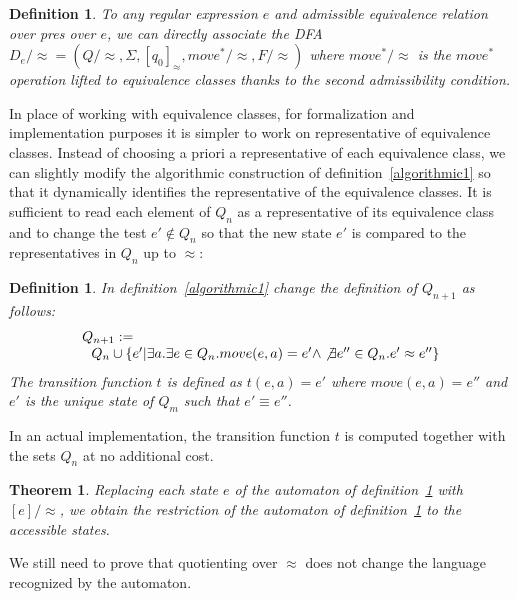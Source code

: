 \documentclass[preprint]{sigplanconf}
\newcounter{item}
\newtheorem{theorem}[item]{Theorem}
\newtheorem{definition}[item]{Definition}
\begin{document}
\begin{definition}\label{nonalgorithmic2}
To any regular expression $e$ and admissible equivalence relation over pres over
$e$, we can directly associate the DFA
$D_e/{\approx} = (Q/{\approx},\Sigma,[q_0]_\approx,move^*/{\approx},F/{\approx})$ where $move^*/{\approx}$ is the $move^*$ operation lifted to equivalence classes
thanks to the second admissibility condition.
\end{definition}

In place of working with equivalence classes, for formalization and implementation purposes it is simpler to work on representative of equivalence classes.
Instead of choosing a priori a representative of each equivalence class, we can slightly modify the algorithmic construction of definition~\ref{algorithmic1} so
that it dynamically identifies the representative of the equivalence classes.
It is sufficient to read each element of $Q_n$ as a representative of its
equivalence class and to change the test $e' \not \in Q_n$ so that the new
state $e'$ is compared to the representatives in $Q_n$ up to $\approx$:

\begin{definition}\label{algorithmic2}
In definition~\ref{algorithmic1} change the definition of $Q_{n+1}$ as follows:
 $$\begin{array}{l}
 Q_{n+1} :=\\
 ~~  Q_n \cup \{ e' | \exists a.\exists e \in Q_n. move(e,a) = e' \land \not \exists e'' \in Q_n. e' \approx e''\}
 \end{array}$$
The transition function $t$ is defined as $t(e,a)=e'$ where
$move(e,a) = e''$ and $e'$ is the unique state of $Q_m$ such that
$e' \equiv e''$.
\end{definition}
In an actual implementation, the transition function $t$ is computed together
with the sets $Q_n$ at no additional cost.

\begin{theorem}
Replacing each state $e$ of the automaton of definition~\ref{algorithmic2}
with $[e]/{\approx}$, we obtain the restriction of the automaton of
definition~\ref{nonalgorithmic2} to the accessible states.
\end{theorem}

We still need to prove that quotienting over $\approx$ does not change the
language recognized by the automaton.
\end{document}
